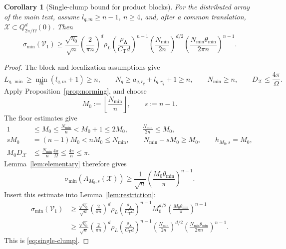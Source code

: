 \documentclass[11pt]{article}
\newtheorem{corollary}{Corollary}
\newcommand{\V}{\mathcal V}
\newcommand{\X}{\mathcal X}
\begin{document}
\begin{corollary}[Single-clump bound for product blocks]\label{cor:single-clump}
For the distributed array of the main text, assume $l_{q,m}\ge n-1$, $n\ge4$, and, after a common translation, $\X\subset Q^d_{2\pi/\Omega}(0)$. Then
\begin{equation}\label{eq:single-clump}
\sigma_{\min}(\V_1)\ge\frac{\sqrt{\eta_0}}{\sqrt n}\left(\frac2{\pi n}\right)^d\rho_L\left(\frac{\rho_{\bm\Lambda}}{C_{\mathrm T}d}\right)^{n-1}\left(\frac{N_{\min}}{2n}\right)^{d/2}\left(\frac{N_{\min}\theta_{\min}}{2\pi n}\right)^{n-1}.
\end{equation}
\end{corollary}
\begin{proof}
The block and localization assumptions give
\[
L_{q,\min}\ge\min_m(l_{q,m}+1)\ge n,\qquad N_q\ge a_{q,r_q}+l_{q,r_q}+1\ge n,\qquad N_{\min}\ge n,\qquad D_\X\le\frac{4\pi}{\Omega}.
\]
Apply Proposition~\ref{prop:norming}, and choose
\[
M_0:=\left\lfloor\frac{N_{\min}}n\right\rfloor,\qquad s:=n-1.
\]
The floor estimates give
\begin{align*}
1&\le M_0\le\frac{N_{\min}}n<M_0+1\le2M_0,\qquad \frac{N_{\min}}{2n}\le M_0,\\
sM_0&=(n-1)M_0<nM_0\le N_{\min},\qquad N_{\min}-sM_0\ge M_0,\qquad h_{M_0,s}=M_0,\\
M_0D_\X&\le\frac{N_{\min}}n\frac{4\pi}{\Omega}\le\frac{4\pi}{n}\le\pi.
\end{align*}
Lemma~\ref{lem:elementary} therefore gives
\[
\sigma_{\min}(A_{M_0,s}(\X))\ge\frac1{\sqrt n}\left(\frac{M_0\theta_{\min}}\pi\right)^{n-1}.
\]
Insert this estimate into Lemma~\ref{lem:restriction}:
\begin{align*}
\sigma_{\min}(\V_1)&\ge\frac{\sqrt{\eta_0}}{\sqrt n}\left(\frac2{\pi n}\right)^d\rho_L\left(\frac{\rho_{\bm\Lambda}}{C_{\mathrm T}d}\right)^{n-1}M_0^{d/2}\left(\frac{M_0\theta_{\min}}\pi\right)^{n-1}\\
&\ge\frac{\sqrt{\eta_0}}{\sqrt n}\left(\frac2{\pi n}\right)^d\rho_L\left(\frac{\rho_{\bm\Lambda}}{C_{\mathrm T}d}\right)^{n-1}\left(\frac{N_{\min}}{2n}\right)^{d/2}\left(\frac{N_{\min}\theta_{\min}}{2\pi n}\right)^{n-1}.
\end{align*}
This is \eqref{eq:single-clump}.
\end{proof}
\end{document}
